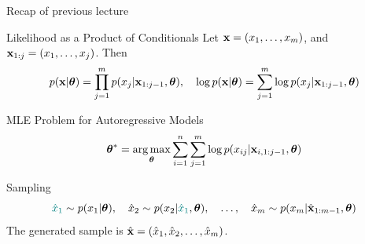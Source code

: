 \documentclass{beamer}
\begin{document}
\begin{frame}{Recap of previous lecture}
	\begin{block}{Likelihood as a Product of Conditionals}
		Let $\mathbf{x} = (x_1, \dots, x_m)$, and $\mathbf{x}_{1:j} = (x_1, \dots, x_j)$. Then 
		\[
		p(\mathbf{x} | \boldsymbol{\theta}) = \prod_{j=1}^m p(x_j | \mathbf{x}_{1:j - 1}, \boldsymbol{\theta}), \quad 
		\log p(\mathbf{x} | \boldsymbol{\theta}) = \sum_{j=1}^m \log p(x_j | \mathbf{x}_{1:j - 1}, \boldsymbol{\theta})
		\]
	\end{block}
	\vspace{-0.3cm}
	\begin{block}{MLE Problem for Autoregressive Models}
		\vspace{-0.3cm}
		\[
		\boldsymbol{\theta}^* = \operatorname*{arg\,max}_{\boldsymbol{\theta}} \sum_{i=1}^n \sum_{j=1}^m \log p(x_{ij} | \mathbf{x}_{i, 1:j - 1}, \boldsymbol{\theta})
		\]
		\vspace{-0.5cm}
	\end{block}
	\begin{block}{Sampling}
		\vspace{-0.5cm}
		\[
		{\color{teal}\hat{x}_1} \sim p(x_1 | \boldsymbol{\theta}), \quad \hat{x}_2 \sim p(x_2 | {\color{teal}\hat{x}_1}, \boldsymbol{\theta}), \quad \dots, \quad \hat{x}_m \sim p(x_m | \hat{\mathbf{x}}_{1:m-1}, \boldsymbol{\theta})
		\]
		The generated sample is $\hat{\mathbf{x}} = (\hat{x}_1, \hat{x}_2, \dots, \hat{x}_m)$.
	\end{block}
\end{frame}
\end{document}
